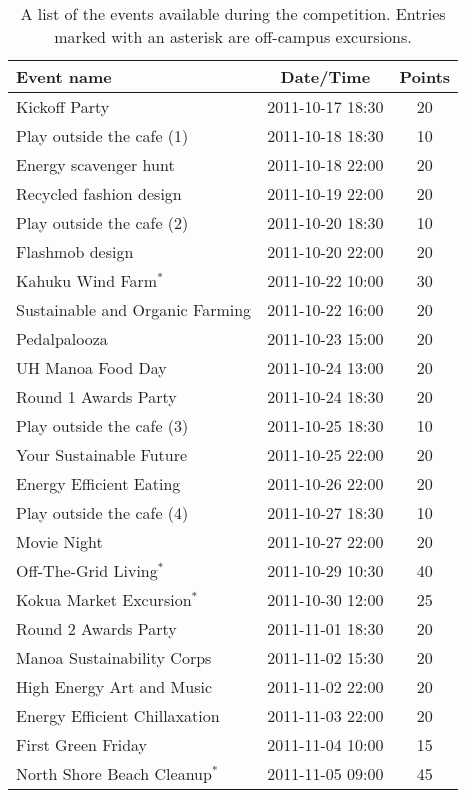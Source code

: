 \begin{table}[htbp]
	\centering
		\begin{tabular}{| l | c | c |}
			\hline
			Event name & Date/Time & Points \tabularnewline \hline \hline
Kickoff Party & 2011-10-17 18:30 & 20 \\
Play outside the cafe (1) & 2011-10-18 18:30 & 10 \\
Energy scavenger hunt & 2011-10-18 22:00 & 20 \\
Recycled fashion design & 2011-10-19 22:00 & 20 \\
Play outside the cafe (2) & 2011-10-20 18:30 & 10 \\
Flashmob design & 2011-10-20 22:00 & 20 \\
Kahuku Wind Farm\ensuremath{^*} & 2011-10-22 10:00 & 30 \\
Sustainable and Organic Farming & 2011-10-22 16:00 & 20 \\
Pedalpalooza & 2011-10-23 15:00 & 20 \\
UH Manoa Food Day & 2011-10-24 13:00 & 20 \\
Round 1 Awards Party & 2011-10-24 18:30 & 20 \\
Play outside the cafe (3) & 2011-10-25 18:30 & 10 \\
Your Sustainable Future & 2011-10-25 22:00 & 20 \\
Energy Efficient Eating & 2011-10-26 22:00 & 20 \\
Play outside the cafe (4) & 2011-10-27 18:30 & 10 \\
Movie Night & 2011-10-27 22:00 & 20 \\
Off-The-Grid Living\ensuremath{^*} & 2011-10-29 10:30 & 40 \\
Kokua Market Excursion\ensuremath{^*} & 2011-10-30 12:00 & 25 \\
Round 2 Awards Party & 2011-11-01 18:30 & 20 \\
Manoa Sustainability Corps & 2011-11-02 15:30 & 20 \\
High Energy Art and Music & 2011-11-02 22:00 & 20 \\
Energy Efficient Chillaxation & 2011-11-03 22:00 & 20 \\
First Green Friday & 2011-11-04 10:00 & 15 \\
North Shore Beach Cleanup\ensuremath{^*} & 2011-11-05 09:00 & 45 \\ \hline
		\end{tabular}
	\caption[A list of the events available during the competition]{A list of the events available during the competition. Entries marked with an asterisk are off-campus excursions.}
\label{tab:event-list}
\end{table}


